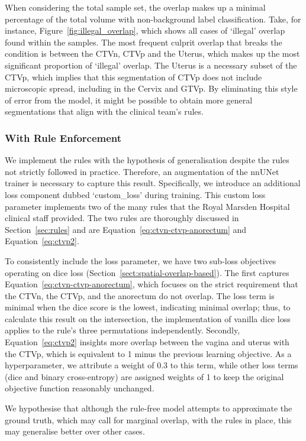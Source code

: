 \documentclass[11pt,twoside]{report}
\begin{document}
When considering the total sample set, the overlap makes up a minimal percentage of the total volume with non-background label classification. Take, for instance, Figure~\ref{fig:illegal_overlap}, which shows all cases of `illegal' overlap found within the samples. The most frequent culprit overlap that breaks the condition is between the CTVn, CTVp and the Uterus, which makes up the most significant proportion of `illegal' overlap. The Uterus is a necessary subset of the CTVp, which implies that this segmentation of CTVp does not include microscopic spread, including in the Cervix and GTVp. By eliminating this style of error from the model, it might be possible to obtain more general segmentations that align with the clinical team's rules.

\subsubsection{With Rule Enforcement}

We implement the rules with the hypothesis of generalisation despite the rules not strictly followed in practice. Therefore, an augmentation of the nnUNet trainer is necessary to capture this result. Specifically, we introduce an additional loss component dubbed `custom\_loss' during training. This custom loss parameter implements two of the many rules that the Royal Marsden Hospital clinical staff provided. The two rules are thoroughly discussed in Section~\ref{sec:rules} and are Equation~\ref{eq:ctvn-ctvp-anorectum} and Equation~\ref{eq:ctvp2}. 

To consistently include the loss parameter, we have two sub-loss objectives operating on dice loss (Section~\ref{sect:spatial-overlap-based}). The first captures Equation~\ref{eq:ctvn-ctvp-anorectum}, which focuses on the strict requirement that the CTVn, the CTVp, and the anorectum do not overlap. The loss term is minimal when the dice score is the lowest, indicating minimal overlap; thus, to calculate this result on the intersection, the implementation of vanilla dice loss applies to the rule's three permutations independently. Secondly, Equation~\ref{eq:ctvp2} insights more overlap between the vagina and uterus with the CTVp, which is equivalent to 1 minus the previous learning objective. As a hyperparameter, we attribute a weight of 0.3 to this term, while other loss terms (dice and binary cross-entropy) are assigned weights of 1 to keep the original objective function reasonably unchanged.

We hypothesise that although the rule-free model attempts to approximate the ground truth, which may call for marginal overlap, with the rules in place, this may generalise better over other cases.
\end{document}
